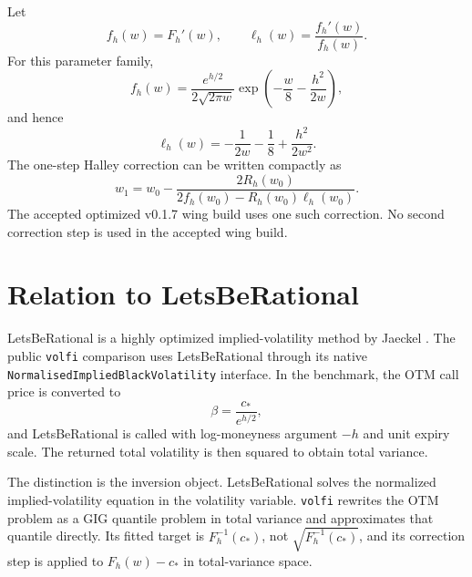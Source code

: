 \documentclass[11pt]{article}
\begin{document}
	Let
	\begin{equation}
		f_h(w)=F_h'(w), \qquad \ell_h(w)=\frac{f_h'(w)}{f_h(w)}.
	\end{equation}
	For this parameter family,
	\begin{equation}
		f_h(w)=\frac{e^{h/2}}{2\sqrt{2\pi w}}\exp\left(-\frac{w}{8}-\frac{h^2}{2w}\right),
	\end{equation}
	and hence
	\begin{equation}
		\ell_h(w)= -\frac{1}{2w}-\frac18+\frac{h^2}{2w^2}.
	\end{equation}
	The one-step Halley correction can be written compactly as
	\begin{equation}
		w_1=w_0-\frac{2R_h(w_0)}{2f_h(w_0)-R_h(w_0)\ell_h(w_0)}.
	\end{equation}
	The accepted optimized v0.1.7 wing build uses one such correction. No second correction step is used in the accepted wing build.
	
	\section{Relation to LetsBeRational}
	
	LetsBeRational is a highly optimized implied-volatility method by Jaeckel \cite{jaeckel2015lets}. The public \texttt{volfi} comparison uses LetsBeRational through its native \texttt{NormalisedImpliedBlackVolatility} interface. In the benchmark, the OTM call price is converted to
	\begin{equation}
		\beta=\frac{c_*}{e^{h/2}},
	\end{equation}
	and LetsBeRational is called with log-moneyness argument $-h$ and unit expiry scale. The returned total volatility is then squared to obtain total variance.
	
	The distinction is the inversion object. LetsBeRational solves the normalized implied-volatility equation in the volatility variable. \texttt{volfi} rewrites the OTM problem as a GIG quantile problem in total variance and approximates that quantile directly. Its fitted target is $F_h^{-1}(c_*)$, not $\sqrt{F_h^{-1}(c_*)}$, and its correction step is applied to $F_h(w)-c_*$ in total-variance space.
	
\end{document}
